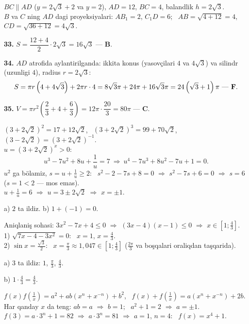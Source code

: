 \newpage
{}
$BC\parallel AD$ ($y=2\sqrt3+2$ va $y=2$), $AD=12$, $BC=4$, balandlik $h=2\sqrt3$.\\
$B$ va $C$ ning $AD$ dagi proyeksiyalari: $AB_1=2$, $C_1D=6$; \ $AB=\sqrt{4+12}=4$, \ $CD=\sqrt{36+12}=4\sqrt3$.

\textbf{33.} $S=\dfrac{12+4}2\cdot2\sqrt3=16\sqrt3$ — \textbf{B}.

\textbf{34.} $AD$ atrofida aylantirilganda: ikkita konus (yasovçilari $4$ va $4\sqrt3$) va silindr (uzunligi $4$), radius $r=2\sqrt3$:
\[S=\pi r\left(4+4\sqrt3\right)+2\pi r\cdot4=8\sqrt3\pi+24\pi+16\sqrt3\pi=24\left(\sqrt3+1\right)\pi\ \text{— \textbf{F}}.\]

\textbf{35.} $V=\pi r^2\left(\dfrac23+4+\dfrac63\right)=12\pi\cdot\dfrac{20}3=80\pi$ — \textbf{C}.

\newpage
{}
$\left(3+2\sqrt2\right)^2=17+12\sqrt2$, \ $\left(3+2\sqrt2\right)^3=99+70\sqrt2$, \ $\left(3-2\sqrt2\right)=\left(3+2\sqrt2\right)^{-1}$.\\
$u=\left(3+2\sqrt2\right)^x>0$:
\[u^3-7u^2+8u+\frac1u=7\ \Rightarrow\ u^4-7u^3+8u^2-7u+1=0.\]
$u^2$ ga bölamiz, $s=u+\frac1u\ge2$: \ $s^2-2-7s+8=0$ $\Rightarrow$ $s^2-7s+6=0$ $\Rightarrow$ $s=6$ ($s=1<2$ — mos emas).\\
$u+\frac1u=6$ $\Rightarrow$ $u=3\pm2\sqrt2$ $\Rightarrow$ $x=\pm1$.

a) $2$ ta ildiz. \quad b) $1+(-1)=0$.

\newpage
{}
Aniqlaniş sohasi: $3x^2-7x+4\le0$ $\Rightarrow$ $(3x-4)(x-1)\le0$ $\Rightarrow$ $x\in\left[1;\frac43\right]$.\\
1) $\sqrt{7x-4-3x^2}=0$: \ $x=1$, $x=\frac43$.\\
2) $\sin x=\frac{\sqrt3}2$: \ $x=\frac\pi3\approx1{,}047\in\left[1;\frac43\right]$ ($\frac{2\pi}3$ va boşqalari oraliqdan taşqarida).

a) $3$ ta ildiz: $1$, $\frac\pi3$, $\frac43$.

b) $1\cdot\frac43=\frac43$.

\newpage
{}
$f(x)f\left(\frac1x\right)=a^2+ab\left(x^n+x^{-n}\right)+b^2$, \ $f(x)+f\left(\frac1x\right)=a\left(x^n+x^{-n}\right)+2b$.\\
Har qanday $x$ da teng: $ab=a$ $\Rightarrow$ $b=1$; \ $a^2+1=2$ $\Rightarrow$ $a=\pm1$.\\
$f(3)=a\cdot3^n+1=82$ $\Rightarrow$ $a\cdot3^n=81$ $\Rightarrow$ $a=1$, $n=4$: \ $f(x)=x^4+1$.

